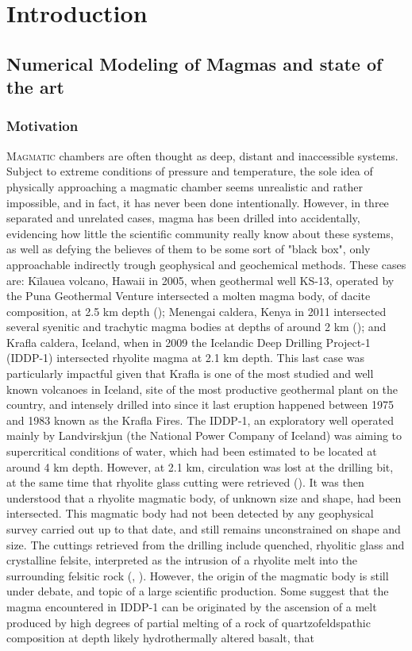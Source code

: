 \chapter{Introduction}

\section{Numerical Modeling of Magmas and state of the art}
\subsection{Motivation}
\lettrine{M}{agmatic} chambers are often thought as deep, distant and inaccessible systems. Subject to extreme conditions of pressure and temperature, the sole idea of physically approaching a magmatic chamber seems unrealistic and rather impossible, and in fact, it has never been done intentionally. However, in three separated and unrelated cases, magma has been drilled into accidentally, evidencing how little the scientific community really know about these systems, as well as defying the believes of them to be some sort of "black box", only approachable indirectly trough geophysical and geochemical methods. These cases are: Kīlauea volcano, Hawaii in 2005, when geothermal well KS-13, operated by the Puna Geothermal Venture intersected a molten magma body, of dacite composition, at 2.5 km depth (\cite{teplow2008}); Menengai caldera, Kenya in 2011 intersected several syenitic and trachytic magma bodies at depths of around 2 km (\cite{mbia2014}); and Krafla caldera, Iceland, when in 2009 the Icelandic Deep Drilling Project-1 (IDDP-1) intersected rhyolite magma at 2.1 km depth. This last case was particularly impactful given that Krafla is one of the most studied and well known volcanoes in Iceland, site of the most productive geothermal plant on the country, and intensely drilled into since it last eruption happened between 1975 and 1983 known as the Krafla Fires. The IDDP-1, an exploratory well operated mainly by Landvirskjun (the National Power Company of Iceland) was aiming to supercritical conditions of water, which had been estimated to be located at around 4 km depth. However, at 2.1 km, circulation was lost at the drilling bit, at the same time that rhyolite glass cutting were retrieved (\cite{elders2011}). It was then understood that a rhyolite magmatic body, of unknown size and shape, had been intersected. This magmatic body had not been detected by any geophysical survey carried out up to that date, and still remains unconstrained on shape and size. The cuttings retrieved from the drilling include quenched, rhyolitic glass and crystalline felsite, interpreted as the intrusion of a rhyolite melt into the surrounding felsitic rock (\cite{gautason2010}, \cite{schiffman2014}). However, the origin of the magmatic body is still under debate, and topic of a large scientific production. Some suggest that the magma encountered in IDDP-1 can be originated by the ascension of a melt produced by high degrees of partial melting of a rock of quartzofeldspathic composition at depth likely hydrothermally altered basalt, that 